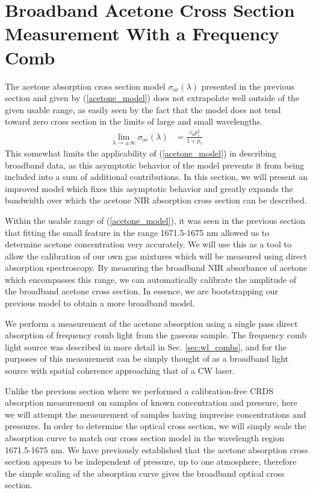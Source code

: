 \documentclass[8pt,a4paper]{report}
\begin{document}
	\section{Broadband Acetone Cross Section Measurement With a Frequency Comb} \label{sec:acetone_broadband}
	The acetone absorption cross section model $\sigma_\mathrm{ac}(\lambda)$ presented in the previous section and given by (\ref{acetone_model}) does not extrapolate well outside of the given usable range, as easily seen by the fact that the model does not tend toward zero cross section in the limits of large and small wavelengths.
	\begin{align*}
		\lim\limits_{\lambda \rightarrow \pm \infty} \sigma_\mathrm{ac}(\lambda) &= \frac{c_0 p_1^2}{1 + p_1}
	\end{align*}
	This somewhat limits the applicability of (\ref{acetone_model}) in describing broadband data, as this asymptotic behavior of the model prevents it from being included into a sum of additional contributions. In this section, we will present an improved model which fixes this asymptotic behavior and greatly expands the bandwidth over which the acetone NIR absorption cross section can be described.
	
	Within the usable range of (\ref{acetone_model}), it was seen in the previous section that fitting the small feature in the range 1671.5-1675 nm allowed us to determine acetone concentration very accurately. We will use this as a tool to allow the calibration of our own gas mixtures which will be measured using direct absorption spectroscopy. By measuring the broadband NIR absorbance of acetone which encompasses this range, we can automatically calibrate the amplitude of the broadband acetone cross section. In essence, we are bootstrapping our previous model to obtain a more broadband model.
	
	We perform a measurement of the acetone absorption using a single pass direct absorption of frequency comb light from the gaseous sample. The frequency comb light source was described in more detail in Sec. \ref{sec:wl_combs}, and for the purposes of this measurement can be simply thought of as a broadband light source with spatial coherence approaching that of a CW laser.
	
	Unlike the previous section where we performed a calibration-free CRDS absorption measurement on samples of known concentration and pressure, here we will attempt the measurement of samples having imprecise concentrations and pressures. In order to determine the optical cross section, we will simply scale the absorption curve to match our cross section model in the wavelength region 1671.5-1675 nm. We have previously established that the acetone absorption cross section appears to be independent of pressure, up to one atmosphere, therefore the simple scaling of the absorption curve gives the broadband optical cross section.
	
\end{document}
